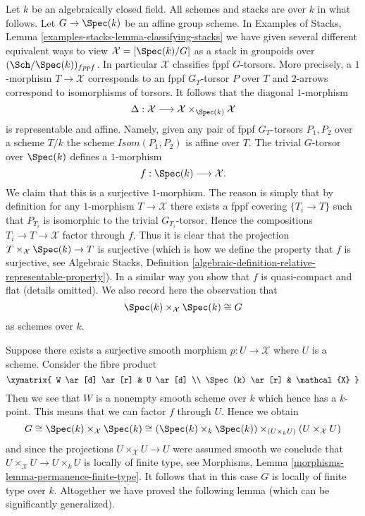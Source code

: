 \medskip\noindent
Let $k$ be an algebraically closed field.
All schemes and stacks are over $k$ in what follows.
Let $G \to \Spec(k)$ be an affine group scheme.
In Examples of Stacks,
Lemma \ref{examples-stacks-lemma-classifying-stacks}
we have given several different equivalent ways to view
$\mathcal{X} = [\Spec(k)/G]$ as a stack in groupoids over
$(\Sch/\Spec(k))_{fppf}$. In particular $\mathcal{X}$ classifies
fppf $G$-torsors. More precisely, a $1$-morphism $T \to \mathcal{X}$
corresponds to an fppf $G_T$-torsor $P$ over $T$ and $2$-arrows
correspond to isomorphisms of torsors. It follows that
the diagonal $1$-morphism
$$
\Delta :
\mathcal{X}
\longrightarrow
\mathcal{X} \times_{\Spec(k)} \mathcal{X}
$$
is representable and affine. Namely, given any pair
of fppf $G_T$-torsors $P_1, P_2$ over a scheme $T/k$ the
scheme $\mathit{Isom}(P_1, P_2)$ is affine over $T$.
The trivial $G$-torsor over $\Spec(k)$ defines a $1$-morphism
$$
f : \Spec(k) \longrightarrow \mathcal{X}.
$$
We claim that this is a surjective $1$-morphism. The reason is simply
that by definition for any $1$-morphism $T \to \mathcal{X}$ there exists
a fppf covering $\{T_i \to T\}$ such that $P_{T_i}$ is isomorphic
to the trivial $G_{T_i}$-torsor. Hence the compositions
$T_i \to T \to \mathcal{X}$ factor through $f$. Thus it is clear that
the projection $T \times_\mathcal{X} \Spec(k) \to T$
is surjective (which is how we define the property that $f$ is surjective, see
Algebraic Stacks,
Definition \ref{algebraic-definition-relative-representable-property}).
In a similar way you show that $f$ is quasi-compact and flat (details omitted).
We also record here the observation that
$$
\Spec(k) \times_\mathcal{X} \Spec(k) \cong G
$$
as schemes over $k$.

\medskip\noindent
Suppose there exists a surjective smooth morphism
$p : U \to \mathcal{X}$ where $U$ is a scheme.
Consider the fibre product
$$
\xymatrix{
W \ar[d] \ar[r] & U \ar[d] \\
\Spec(k) \ar[r] & \mathcal{X}
}
$$
Then we see that $W$ is a nonempty smooth scheme over $k$ which
hence has a $k$-point. This means that we can factor $f$ through $U$.
Hence we obtain
$$
G \cong
\Spec(k) \times_\mathcal{X} \Spec(k) \cong
(\Spec(k) \times_k \Spec(k))
\times_{(U \times_k U)}
(U \times_\mathcal{X} U)
$$
and since the projections $U \times_\mathcal{X} U \to U$ were
assumed smooth we conclude that
$U \times_\mathcal{X} U \to U \times_k U$ is
locally of finite type, see
Morphisms, Lemma \ref{morphisms-lemma-permanence-finite-type}.
It follows that in this case $G$ is locally of finite type over $k$.
Altogether we have proved the following lemma (which can be
significantly generalized).

